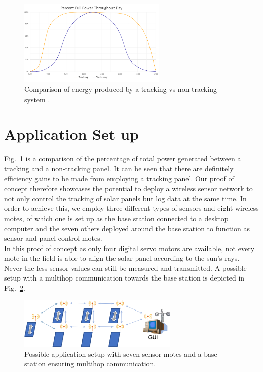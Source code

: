 \documentclass[conference]{IEEEtran}
\begin{document}
\begin{figure}[htbp]
	\includegraphics[width=70mm]{img/ComparisonTrackingVsNoTracking.png}
	\centering
	\captionsetup{justification=centering}
	\caption{Comparison of energy produced by a tracking vs non tracking system \cite{b3}.}
	\label{fig:ComparisonTvsNT}
\end{figure}


\section{Application Set up}
Fig.~\ref{fig:ComparisonTvsNT} is a comparison of the percentage of total power generated between a tracking and a non-tracking panel. It can be seen that there are definitely efficiency gains to be made from employing a tracking panel. Our proof of concept therefore showcases the potential to deploy a wireless sensor network to not only control the tracking of solar panels but log data at the same time. In order to achieve this, we employ three different types of sensors and eight wireless motes, of which one is set up as the base station connected to a desktop computer and the seven others deployed around the base station to function as sensor and panel control motes.\\
In this proof of concept as only four digital servo motors are available, not every mote in the field is able to align the solar panel according to the sun's rays. Never the less sensor values can still be measured and transmitted. A possible setup with a multihop communication towards the base station is depicted in Fig.~\ref{fig:ApplicationSetup}.

\begin{figure}[htbp]
    \includegraphics[width=3in]{img/Application_Setup.png}
    \centering
    \captionsetup{justification=centering}
    \caption{Possible application setup with seven sensor motes and a base station ensuring multihop communication.}
    \label{fig:ApplicationSetup}
\end{figure}
\end{document}
